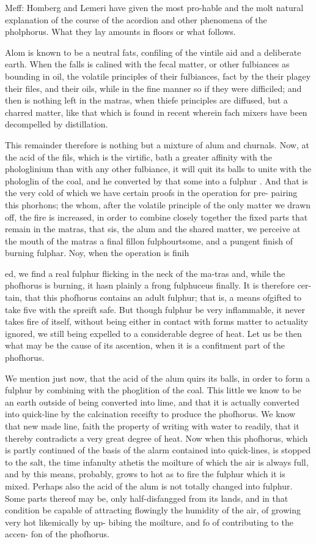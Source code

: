 \documentclass{article}
\begin{document}
Meff: Homberg and Lemeri have given the most pro-hable and the molt natural explanation of the course of the acordion and other phenomena of the pholphorus. What they lay amounts in floors or what follows.

Alom is known to be a neutral fats, confiling of the vintile aid and a deliberate earth. When the falls is calined with the fecal matter, or other fulbiances as bounding in oil, the volatile principles of their fulbiances, fact by the their plagey their files, and their oils, while in the fine manner so if they were difficiled; and then is nothing left in the matras, when thiefe principles are diffused, but a charred matter, like that which is found in recent wherein fach mixers have been decompelled by distillation.

This remainder therefore is nothing but a mixture of alum and churnals. Now, at the acid of the fils, which is the virtific, bath a greater affinity with the phologlinium than with any other fulbiance, it will quit its balls to unite with the phologlin of the coal, and he converted by that some into a fulphur . And that is the very cold of which we have certain proofs in the operation for pre- pairing this phorhons; the whom, after the volatile principle of the only matter we drawn off, the fire is increased, in order to combine closely together the fixed parts that remain in the matras, that sis, the alum and the shared matter, we perceive at the mouth of the matras a final fillon fulphourtsome, and a pungent finish of burning fulphar. Noy, when the operation is finih

ed, we find a real fulphur flicking in the neck of the ma-tras and, while the phofhorus is burning, it hasn plainly a frong fulphuceus finally. It is therefore cer-tain, that this phofhorus contains an adult fulphur; that is, a means ofgifted to take five with the spreift safe. But though fulphur be very inflammable, it never takes fire of itself, without being either in contact with forms matter to actuality ignored, we still being expelled to a considerable degree of heat. Let us be then what may be the cause of its ascention, when it is a confitment part of the phofhorus.

We mention just now, that the acid of the alum quirs its balls, in order to form a fulphur by combining with the phoglition of the coal. This little we know to be an earth outside of being converted into lime, and that it is actually converted into quick-line by the calcination receifty to produce the phofhorus. We know that new made line, faith the property of writing with water to readily, that it thereby contradicts a very great degree of heat. Now when this phofhorus, which is partly continued of the basis of the alarm contained into quick-lines, is stopped to the salt, the time infanulty athetis the moilture of which the air is always full, and by this means, probably, grows to hot as to fire the fulphur which it is mixed. Perhaps also the acid of the alum is not totally changed into fulphur. Some parts thereof may be, only half-disfangged from its lands, and in that condition be capable of attracting flowingly the humidity of the air, of growing very hot likemically by up- bibing the moilture, and fo of contributing to the accen- fon of the phofhorus.
\end{document}
